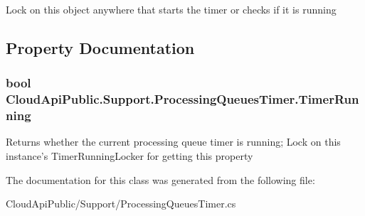 Lock on this object anywhere that starts the timer or checks if it is running 



\subsection{Property Documentation}
\hypertarget{class_cloud_api_public_1_1_support_1_1_processing_queues_timer_ac9b82de50ef2dafdfd052c7b7d641611}{
\subsubsection[{Timer\-Running}]{\setlength{\rightskip}{0pt plus 5cm}bool Cloud\-Api\-Public.\-Support.\-Processing\-Queues\-Timer.\-Timer\-Running\hspace{0.3cm}{\ttfamily [get]}}}\label{class_cloud_api_public_1_1_support_1_1_processing_queues_timer_ac9b82de50ef2dafdfd052c7b7d641611}


Returns whether the current processing queue timer is running; Lock on this instance's Timer\-Running\-Locker for getting this property 



The documentation for this class was generated from the following file\-:\begin{DoxyCompactItemize}
\item 
Cloud\-Api\-Public/\-Support/Processing\-Queues\-Timer.\-cs\end{DoxyCompactItemize}

